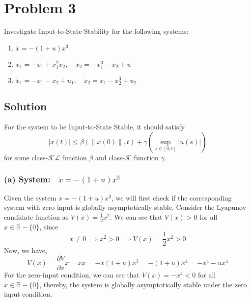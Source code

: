 \section*{Problem 3}

Investigate Input-to-State Stability for the following systems:
\begin{enumerate}[label= (\alph*)]
    \item \( \dot{x}=-(1+u) x^{3} \)
    \item \( \dot{x}_{1}=-x_{1}+x_{1}^{2} x_{2}, \quad \dot{x}_{2}=-x_{1}^{3}-x_{2}+u \)
    \item \( \dot{x}_{1}=-x_{1}-x_{2}+u_{1}, \quad \dot{x}_{2}=x_{1}-x_{2}^{3}+u_{2} \)
\end{enumerate}

\subsection*{Solution}

For the system to be Input-to-State Stable, it should satisfy
\begin{equation*}
    \left| x(t) \right| \leq \beta( \| x(0) \|, t ) + \gamma( \sup_{s \in [0, t]} \left| u(s) \right| )
\end{equation*}
for some class-\( \mathcal{KL} \) function \( \beta \) and class-\( \mathcal{K} \) function \( \gamma \).

\subsubsection*{(a) System:\( \quad \dot{x}=-(1+u) x^{3} \)}

Given the system \( \dot{x}=-(1+u) x^{3} \), we will first check if the corresponding system with zero input is globally asymptotically stable.
Consider the Lyapunov candidate function as \( V(x)=\frac{1}{2} x^{2} \).
We can see that \( V(x) > 0 \) for all \( x \in \mathbb{R} - \{ 0 \} \), since
\begin{equation*}
    x \neq 0
    \implies
    x^2 > 0
    \implies
    V(x)
    =
    \frac{1}{2} x^2 > 0
\end{equation*}
Now, we have,
\begin{equation*}
    \dot{V}(x)
    =
    \frac{\partial V}{\partial x} \dot{x}
    =
    x \dot{x}
    =
    -x (1 + u) x^3
    =
    -(1 + u) x^4
    =
    -x^4 - u x^4
\end{equation*}
For the zero-input condition, we can see that \( \dot{V}(x) = -x^4 < 0 \) for all \( x \in \mathbb{R} - \{ 0 \} \), thereby, the system is globally asymptotically stable under the zero input condition.

